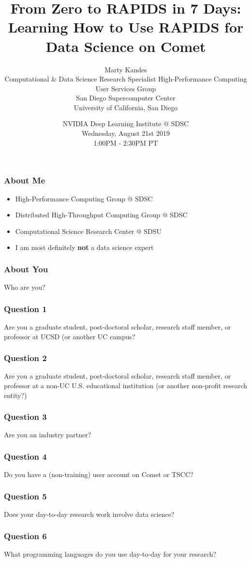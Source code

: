 \documentclass{beamer}
\title{From Zero to RAPIDS in 7 Days: \\
       Learning How to Use RAPIDS for Data Science on Comet}
\author{Marty Kandes \\
   Computational \& Data Science Research Specialist
   High-Performance Computing User Services Group \\ 
   San Diego Supercomputer Center \\
   University of California, San Diego}
\date{NVIDIA Deep Learning Institute @ SDSC \\
   Wednesday, August 21st 2019 \\
   1:00PM - 2:30PM PT}
\begin{document}
\maketitle

\begin{frame}
   \frametitle{About Me}
   \begin{itemize}
      \setlength\itemsep{1.5em}
      \item High-Performance Computing Group @ SDSC
      \item Distributed High-Throughput Computing Group @ SDSC
      \item Computational Science Research Center @ SDSU
      \item I am most definitely \textbf{not} a data science expert
   \end{itemize}
\end{frame}

\begin{frame}
   \frametitle{About You}
   \LARGE
   Who are you?
\end{frame}

\begin{frame}
   \frametitle{Question 1}
   \LARGE
   Are you a graduate student, post-doctoral scholar, research staff member, or professor at UCSD (or another UC campus?
\end{frame}

\begin{frame}
   \frametitle{Question 2}
   \LARGE
   Are you a graduate student, post-doctoral scholar, research staff member, or professor at a non-UC U.S. educational institution (or another non-profit research entity?)
\end{frame}

\begin{frame}
   \frametitle{Question 3}
   \LARGE
   Are you an industry partner?
\end{frame}

\begin{frame}
   \frametitle{Question 4}
   \LARGE
   Do you have a (non-training) user account on Comet or TSCC?
\end{frame}

\begin{frame}
   \frametitle{Question 5}
   \LARGE
   Does your day-to-day research work involve data science?
\end{frame}

\begin{frame}
   \frametitle{Question 6}
   \LARGE
   What programming languages do you use day-to-day for your research?
\end{frame}
\end{document}
